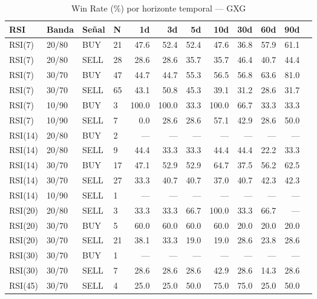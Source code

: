 %
\begin{table}[htbp]
    \centering
    \caption{Win Rate (\%) por horizonte temporal --- GXG}
    \label{tab:winrate_gxg}
    \small
    \begin{tabular}{llllrrrrrrrr}
        \toprule
        \textbf{RSI} & \textbf{Banda} & \textbf{Se\~{n}al} & \textbf{N} & \textbf{1d} & \textbf{3d} & \textbf{5d} & \textbf{10d} & \textbf{30d} & \textbf{60d} & \textbf{90d} \\
        \midrule
        RSI(7) & 20/80 & BUY & 21 & 47.6 & 52.4 & 52.4 & 47.6 & 36.8 & 57.9 & 61.1 \\
        RSI(7) & 20/80 & SELL & 28 & 28.6 & 28.6 & 35.7 & 35.7 & 46.4 & 40.7 & 44.4 \\
        RSI(7) & 30/70 & BUY & 47 & 44.7 & 44.7 & 55.3 & 56.5 & 56.8 & 63.6 & 81.0 \\
        RSI(7) & 30/70 & SELL & 65 & 43.1 & 50.8 & 45.3 & 39.1 & 31.2 & 28.6 & 31.7 \\
        RSI(7) & 10/90 & BUY & 3 & 100.0 & 100.0 & 33.3 & 100.0 & 66.7 & 33.3 & 33.3 \\
        RSI(7) & 10/90 & SELL & 7 & 0.0 & 28.6 & 28.6 & 57.1 & 42.9 & 28.6 & 50.0 \\
        \midrule
        RSI(14) & 20/80 & BUY & 2 & --- & --- & --- & --- & --- & --- & --- \\
        RSI(14) & 20/80 & SELL & 9 & 44.4 & 33.3 & 33.3 & 44.4 & 44.4 & 22.2 & 33.3 \\
        RSI(14) & 30/70 & BUY & 17 & 47.1 & 52.9 & 52.9 & 64.7 & 37.5 & 56.2 & 62.5 \\
        RSI(14) & 30/70 & SELL & 27 & 33.3 & 40.7 & 40.7 & 37.0 & 40.7 & 42.3 & 42.3 \\
        RSI(14) & 10/90 & SELL & 1 & --- & --- & --- & --- & --- & --- & --- \\
        \midrule
        RSI(20) & 20/80 & SELL & 3 & 33.3 & 33.3 & 66.7 & 100.0 & 33.3 & 66.7 & --- \\
        RSI(20) & 30/70 & BUY & 5 & 60.0 & 60.0 & 60.0 & 60.0 & 20.0 & 20.0 & 20.0 \\
        RSI(20) & 30/70 & SELL & 21 & 38.1 & 33.3 & 19.0 & 19.0 & 28.6 & 23.8 & 28.6 \\
        \midrule
        RSI(30) & 30/70 & BUY & 1 & --- & --- & --- & --- & --- & --- & --- \\
        RSI(30) & 30/70 & SELL & 7 & 28.6 & 28.6 & 28.6 & 42.9 & 28.6 & 14.3 & 28.6 \\
        \midrule
        RSI(45) & 30/70 & SELL & 4 & 25.0 & 25.0 & 50.0 & 75.0 & 75.0 & 25.0 & 50.0 \\
        \bottomrule
    \end{tabular}
\end{table}
